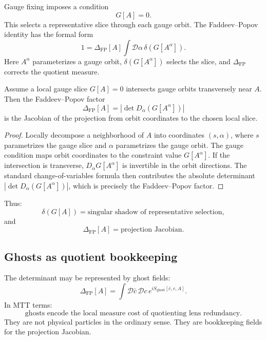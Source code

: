 \documentclass[11pt]{article}
\begin{document}
Gauge fixing imposes a condition
\begin{equation}
G[A]=0.
\end{equation}
This selects a representative slice through each gauge orbit.  The Faddeev--Popov identity
has the formal form
\begin{equation}
1=\Delta_{\mathrm{FP}}[A]\int \mathcal D\alpha\,
\delta(G[A^\alpha]).
\end{equation}
Here \(A^\alpha\) parameterizes a gauge orbit, \(\delta(G[A^\alpha])\) selects the slice,
and \(\Delta_{\mathrm{FP}}\) corrects the quotient measure.

\begin{proposition}\label{prop:fp}
Assume a local gauge slice \(G[A]=0\) intersects gauge orbits transversely near \(A\).  Then
the Faddeev--Popov factor
\begin{equation}
\Delta_{\mathrm{FP}}[A]
=\left|\det D_\alpha(G[A^\alpha])\right|
\end{equation}
is the Jacobian of the projection from orbit coordinates to the chosen local slice.
\end{proposition}

\begin{proof}
Locally decompose a neighborhood of \(A\) into coordinates \((s,\alpha)\), where \(s\)
parametrizes the gauge slice and \(\alpha\) parametrizes the gauge orbit.  The gauge condition
maps orbit coordinates to the constraint value \(G[A^\alpha]\).  If the intersection is
transverse, \(D_\alpha G[A^\alpha]\) is invertible in the orbit directions.  The standard
change-of-variables formula then contributes the absolute determinant
\(\left|\det D_\alpha(G[A^\alpha])\right|\), which is precisely the Faddeev--Popov factor.
\end{proof}

Thus:
\[
\boxed{\delta(G[A])=\text{singular shadow of representative selection},}
\]
and
\[
\boxed{\Delta_{\mathrm{FP}}[A]=\text{projection Jacobian}.}
\]

\subsection{Ghosts as quotient bookkeeping}

The determinant may be represented by ghost fields:
\begin{equation}
\Delta_{\mathrm{FP}}[A]=
\int \mathcal D\bar c\,\mathcal Dc\,e^{iS_{\mathrm{ghost}}[\bar c,c,A]}.
\end{equation}
In MTT terms:
\[
\boxed{\text{ghosts encode the local measure cost of quotienting lens redundancy}.}
\]
They are not physical particles in the ordinary sense.  They are bookkeeping fields for the
projection Jacobian.
\end{document}
